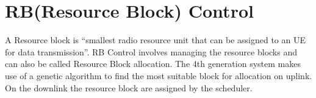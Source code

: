 \section{RB(Resource Block) Control}
{
	A Resource block is \enquote{smallest radio resource unit that can be assigned to an UE for data transmission}\cite{PacketScheduling6226795}. RB Control involves managing the resource blocks and can also be called Resource Block allocation. The 4th generation system makes use of a genetic algorithm to find the most suitable block for allocation on uplink\cite{RBAlloc7577094}. On the downlink the resource block are assigned by the scheduler.
}